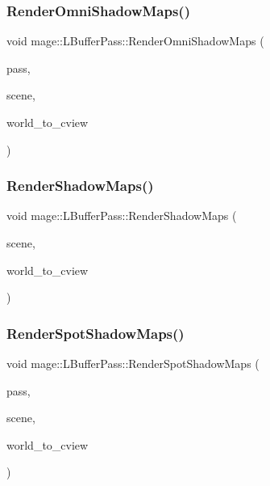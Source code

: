 \subsubsection{\texorpdfstring{Render\+Omni\+Shadow\+Maps()}{RenderOmniShadowMaps()}}
{\footnotesize\ttfamily void mage\+::\+L\+Buffer\+Pass\+::\+Render\+Omni\+Shadow\+Maps (\begin{DoxyParamCaption}\item[{\hyperlink{classmage_1_1_depth_pass}{Depth\+Pass} $\ast$}]{pass,  }\item[{const \hyperlink{structmage_1_1_pass_buffer}{Pass\+Buffer} $\ast$}]{scene,  }\item[{F\+X\+M\+M\+A\+T\+R\+IX}]{world\+\_\+to\+\_\+cview }\end{DoxyParamCaption})\hspace{0.3cm}{\ttfamily [private]}}

\hypertarget{structmage_1_1_l_buffer_pass_ad4c272e242ea28ca4a5c8c43d4c44112}{}\label{structmage_1_1_l_buffer_pass_ad4c272e242ea28ca4a5c8c43d4c44112} 
\subsubsection{\texorpdfstring{Render\+Shadow\+Maps()}{RenderShadowMaps()}}
{\footnotesize\ttfamily void mage\+::\+L\+Buffer\+Pass\+::\+Render\+Shadow\+Maps (\begin{DoxyParamCaption}\item[{const \hyperlink{structmage_1_1_pass_buffer}{Pass\+Buffer} $\ast$}]{scene,  }\item[{F\+X\+M\+M\+A\+T\+R\+IX}]{world\+\_\+to\+\_\+cview }\end{DoxyParamCaption})\hspace{0.3cm}{\ttfamily [private]}}

\hypertarget{structmage_1_1_l_buffer_pass_a3dfd7e644661eda87c627d4795fd2ac9}{}\label{structmage_1_1_l_buffer_pass_a3dfd7e644661eda87c627d4795fd2ac9} 
\subsubsection{\texorpdfstring{Render\+Spot\+Shadow\+Maps()}{RenderSpotShadowMaps()}}
{\footnotesize\ttfamily void mage\+::\+L\+Buffer\+Pass\+::\+Render\+Spot\+Shadow\+Maps (\begin{DoxyParamCaption}\item[{\hyperlink{classmage_1_1_depth_pass}{Depth\+Pass} $\ast$}]{pass,  }\item[{const \hyperlink{structmage_1_1_pass_buffer}{Pass\+Buffer} $\ast$}]{scene,  }\item[{F\+X\+M\+M\+A\+T\+R\+IX}]{world\+\_\+to\+\_\+cview }\end{DoxyParamCaption})\hspace{0.3cm}{\ttfamily [private]}}

